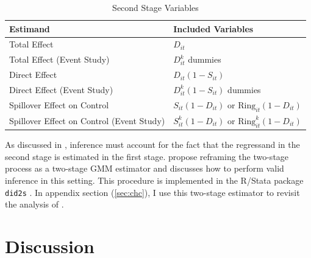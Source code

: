 \documentclass[11pt]{article}
\begin{document}
\begin{table}[!tb]
    \caption{Second Stage Variables}
    \label{tab:second_stage}

    \centering
    \begin{threeparttable}
        \begin{tabular}{@{} *{2}{l} @{}}
            \toprule
            \textbf{Estimand} & \textbf{Included Variables} \\

            \midrule
            Total Effect & $D_{it}$ \\
            Total Effect (Event Study) & $D_{it}^k$ dummies \\
            Direct Effect & $D_{it}(1 - S_{it})$ \\
            Direct Effect (Event Study) & $D_{it}^k(1 - S_{it})$ dummies \\
            Spillover Effect on Control & $S_{it}(1 - D_{it})$ or $\text{Ring}_{it}(1-D_{it})$ \\
            Spillover Effect on Control (Event Study) & $S_{it}^k(1 - D_{it})$ or $\text{Ring}_{it}^k(1-D_{it})$ \\
            \bottomrule
        \end{tabular}
    \end{threeparttable}

\end{table}

As discussed in \citet{Gardner_2021}, inference must account for the fact that the regressand in the second stage is estimated in the first stage. \citet{Gardner_2021} propose reframing the two-stage process as a two-stage GMM estimator and discusses how to perform valid inference in this setting. This procedure is implemented in the R/Stata package \texttt{did2s} \citep{did2s}. In appendix section (\ref{sec:chc}), I use this two-stage estimator to revisit the analysis of \citet{Bailey_Goodman_Bacon_2015}.

\section{Discussion}
\label{sec:conclusion}
\end{document}

